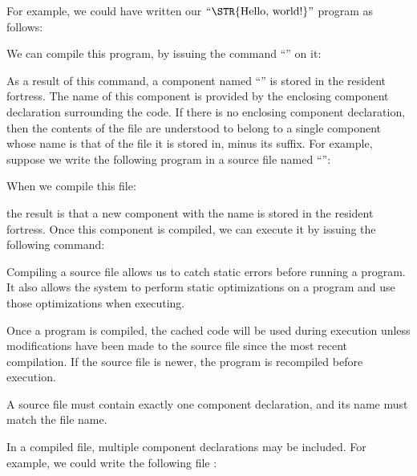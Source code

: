 \begin{itemize}
For example, we could have written our \(\hbox{\rm``\STR{Hello,~world!}''}\)
program as follows:


We can compile this program, by issuing the command
``'' on it:


As a result of this command, a component named ``'' is stored
in the resident fortress. The name of this component is provided by
the enclosing component declaration surrounding the code. If there is
no enclosing component declaration, then the contents of the file are
understood to belong to a single component whose name is that of the
file it is stored in, minus its suffix. For example, suppose we write the
following program in a source file named ``'':


When we compile this file:


the result is that a new component with the name  is stored
in the resident fortress.
Once this component is compiled,
we can execute it by issuing
the following command:


Compiling a source file allows us to catch static errors before running a program.
It also allows the system to perform static optimizations on a program and use those
optimizations when executing.

Once a program is compiled, the cached code will be used during execution unless
modifications have been made to the source file since the most recent compilation.
If the source file is newer, the program is recompiled before execution.

\end{itemize}

A source file must contain exactly one component declaration, and its name must
match the file name.

In a compiled file,
multiple component declarations may be included.
For example, we could write the following file
:

